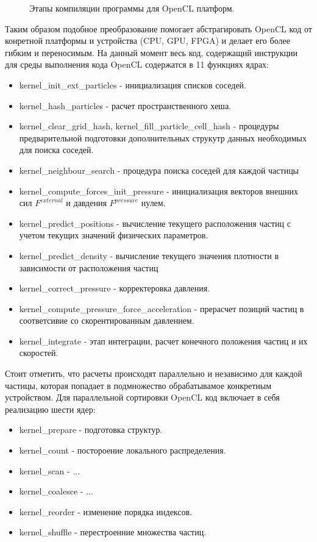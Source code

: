 \begin{figure}[ht]
  \caption{Этапы компиляции программы для OpenCL платформ.}\label{fig:ocl_compiller}
\end{figure}

Таким образом подобное преобразование помогает абстрагировать OpenCL код от конретной платформы и устройства (CPU, GPU, FPGA) и делает его более гибким и переносимым. На данный момент весь код, содержащий инструкции для среды выполнения кода OpenCL содержатся в 11 функциях ядрах:
\begin{itemize}
  \item kernel\_init\_ext\_particles  - инициализация списков соседей.
  \item kernel\_hash\_particles - расчет пространственного хеша.
  \item kernel\_clear\_grid\_hash, kernel\_fill\_particle\_cell\_hash - процедуры предварительной подготовки дополнительных струкутр данных необходимых для поиска соседей.
  \item kernel\_neighbour\_search - процедура поиска соседей для каждой частицы
  \item kernel\_compute\_forces\_init\_pressure - инициализация векторов внешних сил \(F^{external}\) и давдения \(F^{pressure}\) нулем.
  \item kernel\_predict\_positions - вычисление текущего расположения частиц с учетом текущих значений физических параметров.
  \item kernel\_predict\_density - вычисление текущего значения плотности в зависимости от расположения частиц
  \item kernel\_correct\_pressure - корректеровка давления.
  \item kernel\_compute\_pressure\_force\_acceleration - прерасчет позиций частиц в соответсивие со скорентированным давлением.
  \item kernel\_integrate - этап интеграции, расчет конечного положения частиц и их скоростей.
\end{itemize}

Стоит отметить, что расчеты происходят параллельно и независимо для каждой частицы, которая попадает в подмножество обрабатывамое конкретным устройством.
Для параллельной сортировки OpenCL код включает в себя реализацию шести ядер:
\begin{itemize}
  \item kernel\_prepare - подготовка структур.
  \item kernel\_count - постороение локального распределения.
  \item kernel\_scan - ... 
  \item kernel\_coalesce - ... 
  \item kernel\_reorder - изменение порядка индексов.
  \item kernel\_shuffle - перестроенние множества частиц.
\end{itemize}

